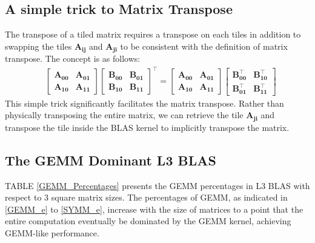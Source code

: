 \documentclass[conference]{IEEEtran}
\begin{document}
\subsection{A simple trick to Matrix Transpose}
\vspace{-0.05in}
The transpose of a tiled matrix requires a transpose on each tiles in addition to swapping the 
tiles $\mathbf{A_{ij}}$ and $\mathbf{A_{ji}}$ to be consistent with the definition of matrix transpose. 
The concept is as follows:\\
\vspace{-0.10in}
\begin{equation*}
\begin{aligned}
&
\begin{bmatrix}
\mathbf{A_{00}} & \mathbf{A_{01}} \\
\mathbf{A_{10}} & \mathbf{A_{11}}
\end{bmatrix}
\begin{bmatrix}
\mathbf{B_{00}} & \mathbf{B_{01}} \\
\mathbf{B_{10}} & \mathbf{B_{11}}
\end{bmatrix}^\intercal 
=
\begin{bmatrix}
\mathbf{A_{00}} & \mathbf{A_{01}} \\
\mathbf{A_{10}} & \mathbf{A_{11}}
\end{bmatrix}
\begin{bmatrix}
\mathbf{B_{00}^\intercal} & \mathbf{B_{10}^\intercal} \\
\mathbf{B_{01}^\intercal} & \mathbf{B_{11}^\intercal}
\end{bmatrix}
\end{aligned}
\end{equation*}
This simple trick significantly facilitates the matrix transpose. Rather than physically 
transposing the entire matrix, we can retrieve the tile $\mathbf{A_{ji}}$ and transpose 
the tile inside the BLAS kernel to implicitly transpose the matrix.

\vspace{-0.12in}
\subsection{The GEMM Dominant L3 BLAS}
\vspace{-0.05in}
TABLE \ref{GEMM_Percentages} presents the GEMM percentages in L3 BLAS with respect to 3 square
matrix sizes. The percentages of GEMM, as indicated in \ref{GEMM_e} to \ref{SYMM_e}, increase
with the size of matrices to a point that the entire computation eventually be dominated by 
the GEMM kernel, achieving GEMM-like performance.
\end{document}
